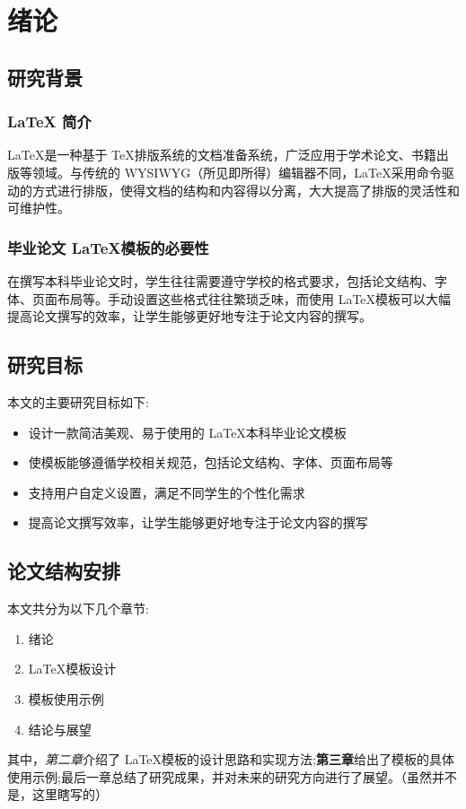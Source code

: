 \chapter{绪论}

\section{研究背景}

\subsection{LaTeX 简介}
\LaTeX 是一种基于 \TeX 排版系统的文档准备系统，广泛应用于学术论文、书籍出版等领域。与传统的 WYSIWYG（所见即所得）编辑器不同，\LaTeX 采用命令驱动的方式进行排版，使得文档的结构和内容得以分离，大大提高了排版的灵活性和可维护性。

\subsection{毕业论文 \LaTeX 模板的必要性}
在撰写本科毕业论文时，学生往往需要遵守学校的格式要求，包括论文结构、字体、页面布局等。手动设置这些格式往往繁琐乏味，而使用 \LaTeX 模板可以大幅提高论文撰写的效率，让学生能够更好地专注于论文内容的撰写。

\section{研究目标}
本文的主要研究目标如下:
\begin{itemize}
\item 设计一款简洁美观、易于使用的 \LaTeX 本科毕业论文模板\cite{brown_online_2023}
\item 使模板能够遵循学校相关规范，包括论文结构、字体、页面布局等\cite{lee_chapter_2022}
\item 支持用户自定义设置，满足不同学生的个性化需求
\item 提高论文撰写效率，让学生能够更好地专注于论文内容的撰写
\end{itemize}

\section{论文结构安排}
本文共分为以下几个章节:
\begin{enumerate}
\item 绪论
\item \LaTeX 模板设计
\item 模板使用示例\cite{smith_neural_2023}
\item 结论与展望
\end{enumerate}

其中，\textit{第二章}介绍了 \LaTeX 模板的设计思路和实现方法;\textbf{第三章}给出了模板的具体使用示例\cite{wang_efficient_2020};最后一章总结了研究成果，并对未来的研究方向进行了展望。（虽然并不是，这里瞎写的）
